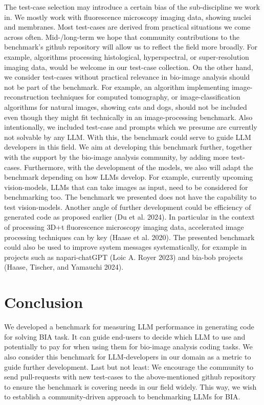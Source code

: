 \documentclass[doubleblind]{ecai}
\begin{document}
The test-case selection may introduce a certain bias of the sub-discipline we work in. We mostly work with fluorescence microscopy imaging data, showing nuclei and membranes. Most test-cases are derived from practical situations we come across often. Mid-/long-term we hope that community contributions to the benchmark’s github repository will allow us to reflect the field more broadly. For example, algorithms processing histological, hyperspectral, or super-resolution imaging data, would be welcome in our test-case collection. On the other hand, we consider test-cases without practical relevance in bio-image analysis should not be part of the benchmark. For example, an algorithm implementing image-reconstruction techniques for computed tomography, or image-classification algorithms for natural images, showing cats and dogs, should not be included even though they might fit technically in an image-processing benchmark. Also intentionally, we included test-case and prompts which we presume are currently not solvable by any LLM. With this, the benchmark could serve to guide LLM developers in this field.
We aim at developing this benchmark further, together with the support by the bio-image analysis community, by adding more test-cases. Furthermore, with the development of the models, we also will adapt the benchmark depending on how LLMs develop. For example, currently upcoming vision-models, LLMs that can take images as input, need to be considered for benchmarking too. The benchmark we presented does not have the capability to test vision-models. Another angle of further development could be efficiency of generated code as proposed earlier (Du et al. 2024). In particular in the context of processing 3D+t fluorescence microscopy imaging data, accelerated image processing techniques can by key (Haase et al. 2020). The presented benchmark could also be used to improve system messages systematically, for example in projects such as napari-chatGPT (Loic A. Royer 2023) and bia-bob projects (Haase, Tischer, and Yamauchi 2024).


\section{Conclusion}

We developed a benchmark for measuring LLM performance in generating code for solving BIA task. It can guide end-users to decide which LLM to use and potentially to pay for when using them for bio-image analysis coding tasks. We also consider this benchmark for LLM-developers in our domain as a metric to guide further development. Last but not least: We encourage the community to send pull-requests with new test-cases to the above-mentioned github repository to ensure the benchmark is covering needs in our field widely. This way, we wish to establish a community-driven approach to benchmarking LLMs for BIA. 
\end{document}
